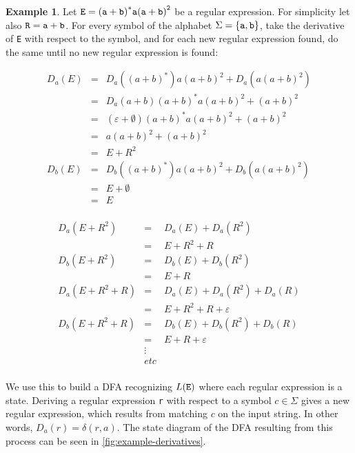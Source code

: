 \documentclass{article}
\theoremstyle{definition}
\newtheorem{ex}{Example}
\newcommand{\emptystr}{\varepsilon}
\newcommand{\emptylan}{\emptyset}
\begin{document}
\begin{ex}
Let $\tt E = {(a+b)}^*a{(a+b)}^2$ be a regular expression. For
simplicity let also $\tt R = a + b$. For every symbol of
the alphabet $\Sigma = \{{\tt a, b}\}$, take the derivative of {\tt E} with
respect to the symbol, and for each new regular expression found, do the same
until no new regular expression is found:

\begin{minipage}[t]{.5\textwidth}
\[
  \begin{array}{rcl}
    D_a(E) &=& D_a({(a+b)}^*)a{(a+b)}^2 + D_a(a{(a+b)}^2) \\
           &=& D_a{(a+b)}{(a+b)}^*a{(a+b)}^2 + {(a+b)}^2 \\
           &=& (\emptystr+\emptylan){(a+b)}^*a{(a+b)}^2 + {(a+b)}^2 \\
           &=& a{(a+b)}^2 + {(a+b)}^2 \\
           &=& E + R^2 \\
    D_b(E) &=& D_b({(a+b)}^*)a{(a+b)}^2 + D_b(a{(a+b)}^2) \\
           &=& E + \emptylan \\
           &=& E \\
\end{array}
\]
\end{minipage}%
\begin{minipage}[t]{.5\textwidth}
\[
  \begin{array}{rcl}
    D_a(E + R^2) &=& D_a(E) + D_a(R^2) \\
                 &=& E + R^2 + R \\
    D_b(E + R^2) &=& D_b(E) + D_b(R^2) \\
                 &=& E + R \\
    D_a(E + R^2 + R) &=& D_a(E) + D_a(R^2) + D_a(R)\\
                     &=& E + R^2 + R + \emptystr \\
    D_b(E + R^2 + R) &=& D_b(E) + D_b(R^2) + D_b(R)\\
                     &=& E + R + \emptystr\\
                     &\vdots&\\
                     & etc &\\
  \end{array}
\]
\end{minipage}

We use this to build a DFA recognizing $L({\tt E})$ where each regular
expression is a state. Deriving a regular expression {\tt r} with
respect to a symbol $c \in \Sigma$ gives a new regular expression, which
results from matching $c$ on the input string. In other words, $D_a(r) =
\delta(r, a)$. The state diagram of the DFA resulting from this process can be
seen in \autoref{fig:example-derivatives}.


\end{ex}
\end{document}
